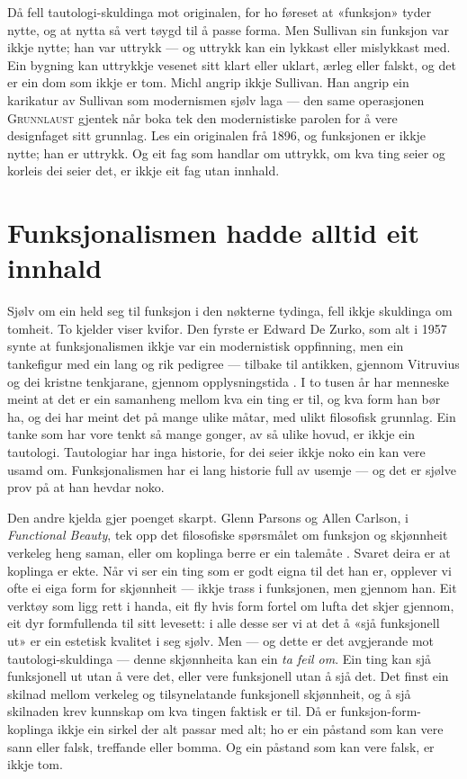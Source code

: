Då fell tautologi-skuldinga mot originalen, for ho føreset at «funksjon» tyder nytte, og at nytta så vert tøygd til å passe forma. Men Sullivan sin funksjon var ikkje nytte; han var uttrykk — og uttrykk kan ein lykkast eller mislykkast med. Ein bygning kan uttrykkje vesenet sitt klart eller uklart, ærleg eller falskt, og det er ein dom som ikkje er tom. Michl angrip ikkje Sullivan. Han angrip ein karikatur av Sullivan som modernismen sjølv laga — den same operasjonen \textsc{Grunnlaust} gjentek når boka tek den modernistiske parolen for å vere designfaget sitt grunnlag. Les ein originalen frå 1896, og funksjonen er ikkje nytte; han er uttrykk. Og eit fag som handlar om uttrykk, om kva ting seier og korleis dei seier det, er ikkje eit fag utan innhald.

\section{Funksjonalismen hadde alltid eit innhald}

Sjølv om ein held seg til funksjon i den nøkterne tydinga, fell ikkje skuldinga om tomheit. To kjelder viser kvifor. Den fyrste er Edward De Zurko, som alt i 1957 synte at funksjonalismen ikkje var ein modernistisk oppfinning, men ein tankefigur med ein lang og rik pedigree — tilbake til antikken, gjennom Vitruvius og dei kristne tenkjarane, gjennom opplysningstida \autocite{dezurko1957origins}. I to tusen år har menneske meint at det er ein samanheng mellom kva ein ting er til, og kva form han bør ha, og dei har meint det på mange ulike måtar, med ulikt filosofisk grunnlag. Ein tanke som har vore tenkt så mange gonger, av så ulike hovud, er ikkje ein tautologi. Tautologiar har inga historie, for dei seier ikkje noko ein kan vere usamd om. Funksjonalismen har ei lang historie full av usemje — og det er sjølve prov på at han hevdar noko.

Den andre kjelda gjer poenget skarpt. Glenn Parsons og Allen Carlson, i \emph{Functional Beauty}, tek opp det filosofiske spørsmålet om funksjon og skjønnheit verkeleg heng saman, eller om koplinga berre er ein talemåte \autocite{parsons2008functional}. Svaret deira er at koplinga er ekte. Når vi ser ein ting som er godt eigna til det han er, opplever vi ofte ei eiga form for skjønnheit — ikkje trass i funksjonen, men gjennom han. Eit verktøy som ligg rett i handa, eit fly hvis form fortel om lufta det skjer gjennom, eit dyr formfullenda til sitt levesett: i alle desse ser vi at det å «sjå funksjonell ut» er ein estetisk kvalitet i seg sjølv. Men — og dette er det avgjerande mot tautologi-skuldinga — denne skjønnheita kan ein \emph{ta feil om}. Ein ting kan sjå funksjonell ut utan å vere det, eller vere funksjonell utan å sjå det. Det finst ein skilnad mellom verkeleg og tilsynelatande funksjonell skjønnheit, og å sjå skilnaden krev kunnskap om kva tingen faktisk er til. Då er funksjon-form-koplinga ikkje ein sirkel der alt passar med alt; ho er ein påstand som kan vere sann eller falsk, treffande eller bomma. Og ein påstand som kan vere falsk, er ikkje tom.


